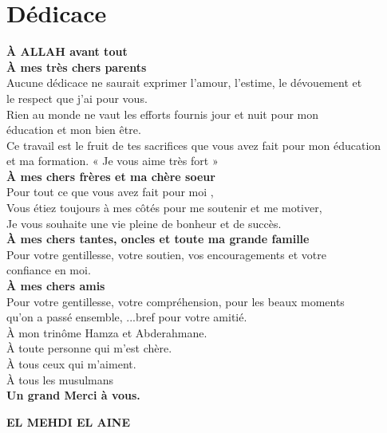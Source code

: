 \documentclass[a4paper]{report}
\begin{document}
\chapter*{Dédicace}
\begin{center}
\textbf{À ALLAH avant tout\\
À mes très chers parents\\}
Aucune dédicace ne saurait exprimer l’amour, l’estime, le dévouement et\\ le respect que j’ai pour vous.\\
Rien au monde ne vaut les efforts fournis jour et nuit pour mon\\
éducation et mon bien être.\\
Ce travail est le fruit de tes sacrifices que vous avez fait pour mon éducation\\et ma formation. « Je vous aime très fort »\\
\bigskip
\textbf{À mes chers frères et ma chère soeur\\}
Pour tout ce que vous avez fait pour moi ,\\Vous étiez toujours à mes côtés pour me soutenir et me motiver,\\ Je vous souhaite une vie pleine de bonheur et de succès.\\
\bigskip
\textbf{À mes chers tantes, oncles et toute ma grande famille\\}
Pour votre gentillesse, votre soutien, vos encouragements et votre\\
confiance en moi.\\
\bigskip
\textbf{À mes chers amis\\}
Pour votre gentillesse, votre compréhension, pour les beaux moments\\ qu’on a passé ensemble, ...bref pour votre amitié.\\
À mon trinôme Hamza et Abderahmane.\\
À toute personne qui m’est chère.\\
À tous ceux qui m’aiment.\\
À tous les musulmans\\
\bigskip \bigskip
\textbf{Un grand Merci à vous.}
\end{center}
\bigskip \bigskip
\begin{flushright}
\textbf{EL MEHDI EL AINE}
\end{flushright}
\end{document}
